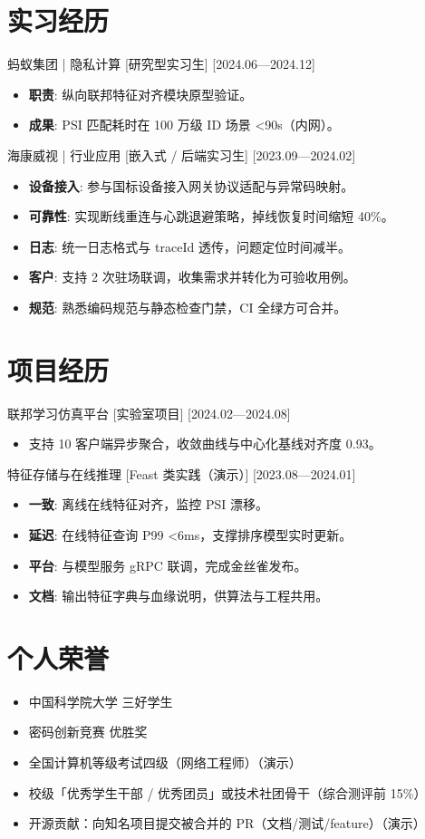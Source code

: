 \documentclass{resume-photo}
\begin{document}
\section{实习经历}
\ResumeItem
{蚂蚁集团 | 隐私计算}
[\textnormal{研究型实习生}]
[2024.06—2024.12]

\begin{itemize}
  \item \textbf{职责}: 纵向联邦特征对齐模块原型验证。
  \item \textbf{成果}: PSI 匹配耗时在 100 万级 ID 场景 <90s（内网）。
\end{itemize}


\ResumeItem
{海康威视 | 行业应用}
[\textnormal{嵌入式 / 后端实习生}]
[2023.09—2024.02]

\begin{itemize}
  \item \textbf{设备接入}: 参与国标设备接入网关协议适配与异常码映射。
  \item \textbf{可靠性}: 实现断线重连与心跳退避策略，掉线恢复时间缩短 40\%。
  \item \textbf{日志}: 统一日志格式与 traceId 透传，问题定位时间减半。
  \item \textbf{客户}: 支持 2 次驻场联调，收集需求并转化为可验收用例。
  \item \textbf{规范}: 熟悉编码规范与静态检查门禁，CI 全绿方可合并。
\end{itemize}



\section{项目经历}
\ResumeItem
{联邦学习仿真平台}
[\textnormal{实验室项目}]
[2024.02—2024.08]

\begin{itemize}
  \item 支持 10 客户端异步聚合，收敛曲线与中心化基线对齐度 0.93。
\end{itemize}


\ResumeItem
{特征存储与在线推理}
[\textnormal{Feast 类实践（演示）}]
[2023.08—2024.01]

\begin{itemize}
  \item \textbf{一致}: 离线在线特征对齐，监控 PSI 漂移。
  \item \textbf{延迟}: 在线特征查询 P99 <6ms，支撑排序模型实时更新。
  \item \textbf{平台}: 与模型服务 gRPC 联调，完成金丝雀发布。
  \item \textbf{文档}: 输出特征字典与血缘说明，供算法与工程共用。
\end{itemize}



\section{个人荣誉}
\begin{itemize}
  \item 中国科学院大学 三好学生
  \item 密码创新竞赛 优胜奖
  \item 全国计算机等级考试四级（网络工程师）（演示）
  \item 校级「优秀学生干部 / 优秀团员」或技术社团骨干（综合测评前 15\%）
  \item 开源贡献：向知名项目提交被合并的 PR（文档/测试/feature）（演示）
\end{itemize}
\end{document}
